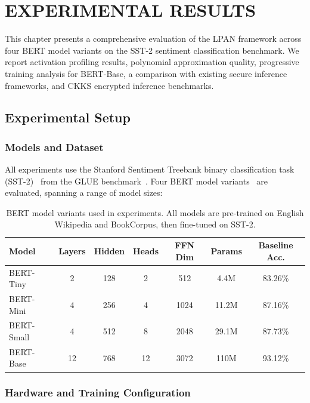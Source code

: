 \chapter{EXPERIMENTAL RESULTS}
\label{ch:results}

This chapter presents a comprehensive evaluation of the LPAN framework across four BERT model variants on the SST-2 sentiment classification benchmark. We report activation profiling results, polynomial approximation quality, progressive training analysis for BERT-Base, a comparison with existing secure inference frameworks, and CKKS encrypted inference benchmarks.

\section{Experimental Setup}
\label{sec:setup}

\subsection{Models and Dataset}

All experiments use the Stanford Sentiment Treebank binary classification task (SST-2)~\cite{socher2013recursive} from the GLUE benchmark~\cite{wang2019glue}. Four BERT model variants~\cite{devlin2019bert, turc2019well} are evaluated, spanning a range of model sizes:

\begin{table}[ht]
\centering
\caption{BERT model variants used in experiments. All models are pre-trained on English Wikipedia and BookCorpus, then fine-tuned on SST-2.}
\label{tab:model_variants}
\begin{tabular}{lcccccc}
\toprule
\textbf{Model} & \textbf{Layers} & \textbf{Hidden} & \textbf{Heads} & \textbf{FFN Dim} & \textbf{Params} & \textbf{Baseline Acc.} \\
\midrule
BERT-Tiny  & 2  & 128 & 2  & 512   & 4.4M  & 83.26\% \\
BERT-Mini  & 4  & 256 & 4  & 1024  & 11.2M & 87.16\% \\
BERT-Small & 4  & 512 & 8  & 2048  & 29.1M & 87.73\% \\
BERT-Base  & 12 & 768 & 12 & 3072  & 110M  & 93.12\% \\
\bottomrule
\end{tabular}
\end{table}

\subsection{Hardware and Training Configuration}

